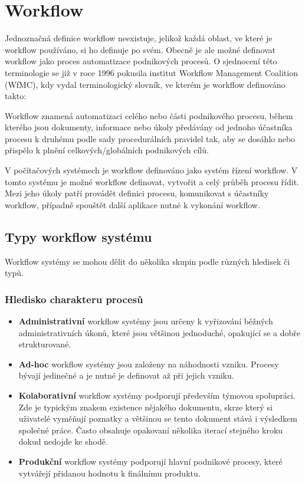 \documentclass{fithesis}
\begin{document}
\chapter{Workflow}
Jednoznačná definice workflow neexistuje, jelikož každá oblast, ve které je workflow používáno, si ho definuje po svém. Obecně je ale možné definovat workflow jako proces automatizace podnikových procesů. O sjednocení této terminologie se již v roce 1996 pokusila institut Workflow Management Coalition (WfMC), kdy vydal terminologický slovník, ve kterém je workflow definováno takto: 

Workflow znamená automatizaci celého nebo části podnikového procesu, během kterého jsou dokumenty, informace nebo úkoly předávány od jednoho účastníka procesu k druhému podle sady procedurálních pravidel tak, aby se dosáhlo nebo přispělo k plnění celkových/globálních podnikových cílů. \cite{wfmc}

V počítačových systémech je workflow definováno jako systém řízení workflow. V tomto systému je možné workflow definovat, vytvořit a celý průběh procesu řídit. Mezi jeho úkoly patří provádět definici procesu, komunikovat s účastníky workflow, případně spouštět další aplikace nutné k vykonání workflow.


\section{Typy workflow systému}
Workflow systémy se mohou dělit do několika skupin podle různých hledisek či typů. \cite{workflow}

\subsection{Hledisko charakteru procesů}
\begin{itemize}
\item \textbf{Administrativní} workflow systémy jsou určeny k vyřizování běžných administrativních úkonů, které jsou většinou jednoduché, opakující se a dobře strukturované.
\item \textbf{Ad-hoc} workflow systémy jsou založeny na náhodnosti vzniku. Procesy bývají jedinečné a je nutné je definovat až při jejich vzniku.
\item \textbf{Kolaborativní} workflow systémy podporují především týmovou spolupráci. Zde je typickým znakem existence nějakého dokumentu, skrze který si uživatelé vyměňují poznatky a většinou se tento dokument stává i výsledkem společné práce. Často obsahuje opakovaní několika iterací stejného kroku dokud nedojde ke shodě.
\item \textbf{Produkční} workflow systémy podporují hlavní podnikové procesy, které vytvářejí přidanou hodnotu k finálnímu produktu.
\end{itemize}
\end{document}
